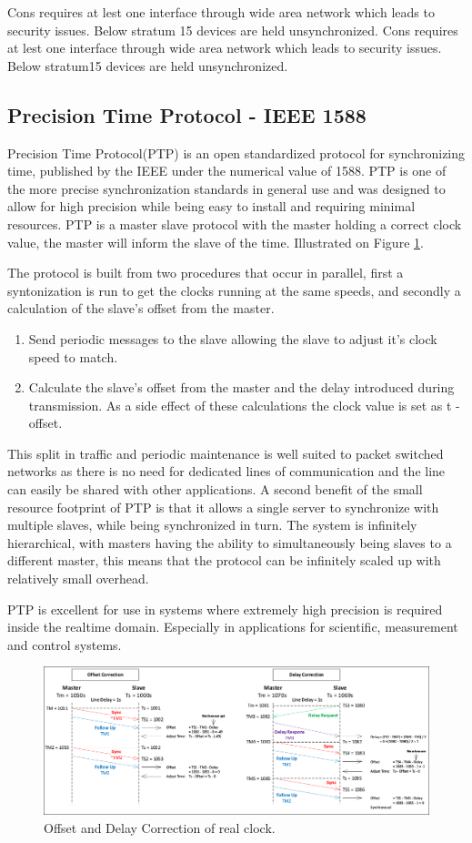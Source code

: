 \noindent Cons requires at lest one interface through wide area network which leads to security issues. Below stratum
15 devices are held unsynchronized.
Cons requires at lest one interface through wide area network which leads to security issues. Below stratum15 devices are held unsynchronized.

\subsection{Precision Time Protocol - IEEE 1588}

Precision Time Protocol(PTP) is an open standardized protocol for synchronizing time, published by the IEEE under the numerical value of 1588. PTP is one of the more precise synchronization standards in general use and was designed to allow for high precision while being easy to install and requiring minimal resources. PTP is a master slave protocol with the master holding a correct clock value, the master will inform the slave of the time.  Illustrated on Figure \ref{fig:offsetAndDelayCorrection}.

The protocol is built from two procedures that occur in parallel, first a syntonization is run to get the clocks running at the same speeds, and secondly a calculation of the slave's offset from the master.
\begin{enumerate}
	\item Send periodic messages to the slave allowing the slave to adjust it's clock speed to match.
	\item Calculate the slave's offset from the master and the delay introduced during transmission. As a side effect of these calculations the clock value is set as t - offset.
\end{enumerate}

This split in traffic and periodic maintenance is well suited to packet switched networks as there is no need for dedicated lines of communication and the line can easily be shared with other applications. A second benefit of the small resource footprint of PTP is that it allows a single server to synchronize with multiple slaves, while being synchronized in turn. The system is infinitely hierarchical, with masters having the ability to simultaneously being slaves to a different master, this means that the protocol can be infinitely scaled up with relatively small overhead.

PTP is excellent for use in systems where extremely high precision is required  inside the realtime domain. Especially in applications for scientific, measurement and control systems.

\begin{figure}[H]
	\centering
	\includegraphics[width=\linewidth]{synchronization/realClock/fig/offsetAndDelayCorrection.pdf}
	\caption{Offset and Delay Correction of real clock.}
	\label{fig:offsetAndDelayCorrection}
\end{figure}